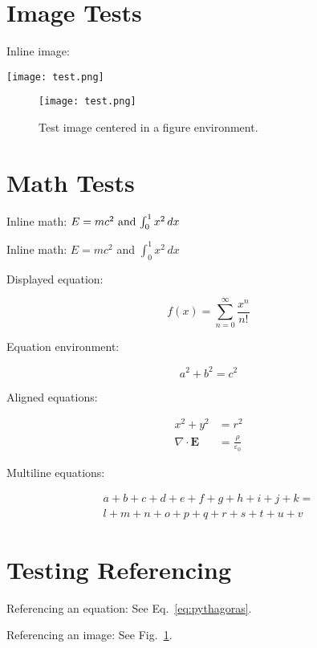 \documentclass{article}
\begin{document}
\section{Image Tests}

Inline image:

\texttt{[image: test.png]}

\begin{figure}[h]
    \centering
    \texttt{[image: test.png]}
    \caption{Test image centered in a figure environment.}
    \label{fig:test_image}
\end{figure}

\newpage

\section{Math Tests}

Inline math: \(E=mc^2$ and $\int_0^1 x^2 \,dx\)

Inline math: $E=mc^2$ and $\int_0^1 x^2 \,dx$

Displayed equation:

\[
    f(x) = \sum_{n=0}^{\infty} \frac{x^n}{n!}
\]

Equation environment:

\begin{equation}
    a^2 + b^2 = c^2
    \label{eq:pythagoras}
\end{equation}

Aligned equations:

\begin{align}
    x^2 + y^2 &= r^2 \\
    \nabla \cdot \mathbf{E} &= \frac{\rho}{\varepsilon_0}
\end{align}

Multiline equations:

\begin{multline}
    a + b + c + d + e + f + g + h + i + j + k = \\
    l + m + n + o + p + q + r + s + t + u + v
\end{multline}

\newpage

\section{Testing Referencing}

Referencing an equation: See Eq.~\ref{eq:pythagoras}.

Referencing an image: See Fig.~\ref{fig:test_image}.
\end{document}

